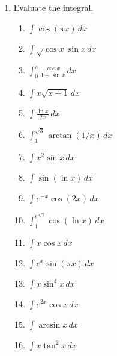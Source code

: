 \documentclass[letterpaper]{article}
\begin{document}
\begin{enumerate}

\item Evaluate the integral.
	\begin{enumerate}

	\item $\int \cos (\pi x) \,dx$

	\item $\int \sqrt{\cos x}\sin x\, dx$

	\item $\int_0^\pi \frac{\cos x}{1+\sin x}\,dx$ 

	\item $\int x \sqrt{x+1}\, dx$

	\item $\int \frac{\ln x}{2x}\, dx$

	\item $\int_1^{\sqrt{3}} \arctan(1/x)\,dx$

	\item $\int x^2\sin x\,dx$

	\item $\int \sin(\ln x)\, dx$

	\item $\int e^{-x} \cos(2x)\, dx$

	\item $\int_1^{e^{\pi/2}} \cos (\ln x)\,dx$

	\item $\int x\cos x\,dx$

	\item $\int e^x \sin (\pi x)\,dx$

	\item $\int x \sin^4 x\,dx$

	\item $\int e^{2x} \cos x \,dx$

	\item $\int \arcsin x \, dx$

	\item $\int x \tan^2 x\,dx$


\end{enumerate}
\end{enumerate}
\end{document}
